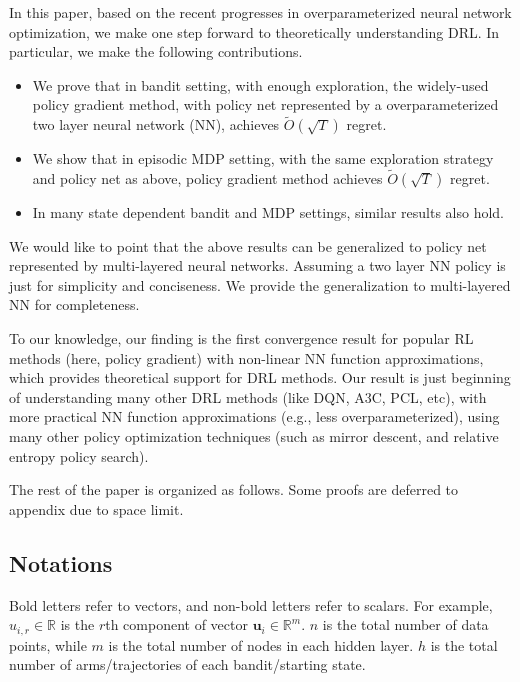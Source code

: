 \documentclass{article}
\def\rvu{{\mathbf{u}}}
\def\sR{{\mathbb{R}}}
\begin{document}
In this paper, based on the recent progresses in overparameterized neural network optimization, we make one step forward to theoretically understanding DRL. In particular, we make the following contributions.
\begin{itemize}
    \item We prove that in bandit setting, with enough exploration, the widely-used policy gradient method, with policy net represented by a overparameterized two layer neural network (NN), achieves $\tilde{O}\left( \sqrt{T} \right)$ regret.
    \item We show that in episodic MDP setting, with the same exploration strategy and policy net as above, policy gradient method achieves $\tilde{O}\left( \sqrt{T} \right)$ regret.
    \item In many state dependent bandit and MDP settings, similar results also hold.
\end{itemize}

We would like to point that the above results can be generalized to policy net represented by multi-layered neural networks. Assuming a two layer NN policy is just for simplicity and conciseness. We provide the generalization to multi-layered NN for completeness.

To our knowledge, our finding is the first convergence result for popular RL methods (here, policy gradient) with non-linear NN function approximations, which provides theoretical support for DRL methods. Our result is just beginning of understanding many other DRL methods (like DQN, A3C, PCL, etc), with more practical NN function approximations (e.g., less overparameterized), using many other policy optimization techniques (such as mirror descent, and relative entropy policy search).

The rest of the paper is organized as follows. Some proofs are deferred to appendix due to space limit.

\subsection{Notations}

Bold letters refer to vectors, and non-bold letters refer to scalars. For example, $u_{i,r} \in \sR$ is the $r$th component of vector $\rvu_i \in \sR^m$. $n$ is the total number of data points, while $m$ is the total number of nodes in each hidden layer. $h$ is the total number of arms/trajectories of each bandit/starting state.
\end{document}
